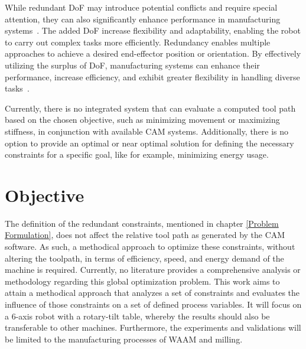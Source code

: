 
While redundant DoF may introduce potential conflicts and require special attention, they can also significantly enhance performance in manufacturing systems~\cite{Ayten.2016}. The added DoF increase flexibility and adaptability, enabling the robot to carry out complex tasks more efficiently. Redundancy enables multiple approaches to achieve a desired end-effector position or orientation. By effectively utilizing the surplus of DoF, manufacturing systems can enhance their performance, increase efficiency, and exhibit greater flexibility in handling diverse tasks~\cite{Boscariol.2020}. 

Currently, there is no integrated system that can evaluate a computed tool path based on the chosen objective, such as minimizing movement or maximizing stiffness, in conjunction with available CAM systems. Additionally, there is no option to provide an optimal or near optimal solution for defining the necessary constraints for a specific goal, like for example, minimizing energy usage.


\section{Objective}%
The definition of the redundant constraints, mentioned in chapter \ref{Problem Formulation}, does not affect the relative tool path as generated by the CAM software. As such, a methodical approach to optimize these constraints, without altering the toolpath, in terms of efficiency, speed, and energy demand of the machine is required. Currently, no literature provides a comprehensive analysis or methodology regarding this global optimization problem.
This work aims to attain a methodical approach that analyzes a set of constraints and evaluates the influence of those constraints on a set of defined process variables. It will focus on a 6-axis robot with a rotary-tilt table, whereby the results should also be transferable to other machines. Furthermore, the experiments and validations will be limited to the manufacturing processes of WAAM and milling. 


